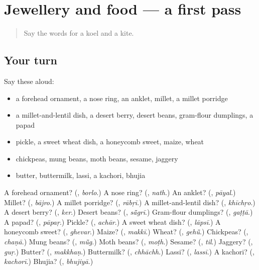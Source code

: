 \section[(dialogue)]{Jewellery and food — a first pass}

\label{lesson:MW-R139-first-pass-jewellery-and-food}



\begin{quote}
Say the words for a koel and a kite.
\end{quote}

\subsection*{Your turn}
Say these aloud:

\begin{itemize}
\raggedright
  \item a forehead ornament, a nose ring, an anklet, millet, a millet porridge
  \item a millet-and-lentil dish, a desert berry, desert beans, gram-flour dumplings, a papad
  \item pickle, a sweet wheat dish, a honeycomb sweet, maize, wheat
  \item chickpeas, mung beans, moth beans, sesame, jaggery
  \item butter, buttermilk, lassi, a kachori, bhujia
\end{itemize}

\begin{tcolorbox}[breakable,colback=teal!4,colframe=teal!35!black,title={Before you move on}]
A forehead ornament? (\textbf{}, \emph{borlo}.) A nose ring? (\textbf{}, \emph{nath}.) An anklet? (\textbf{}, \emph{pāyal}.) Millet? (\textbf{}, \emph{bājro}.) A millet porridge? (\textbf{}, \emph{rābṛī}.) A millet-and-lentil dish? (\textbf{}, \emph{khīchṛo}.) A desert berry? (\textbf{}, \emph{ker}.) Desert beans? (\textbf{}, \emph{sā̃grī}.) Gram-flour dumplings? (\textbf{}, \emph{gaṭṭā}.) A papad? (\textbf{}, \emph{pāpaṛ}.) Pickle? (\textbf{}, \emph{achār}.) A sweet wheat dish? (\textbf{}, \emph{lāpsī}.) A honeycomb sweet? (\textbf{}, \emph{ghevar}.) Maize? (\textbf{}, \emph{makkī}.) Wheat? (\textbf{}, \emph{gehū̃}.) Chickpeas? (\textbf{}, \emph{chaṇā}.) Mung beans? (\textbf{}, \emph{mū̃g}.) Moth beans? (\textbf{}, \emph{moṭh}.) Sesame? (\textbf{}, \emph{til}.) Jaggery? (\textbf{}, \emph{guṛ}.) Butter? (\textbf{}, \emph{makkhaṇ}.) Buttermilk? (\textbf{}, \emph{chhāchh}.) Lassi? (\textbf{}, \emph{lassī}.) A kachori? (\textbf{}, \emph{kachorī}.) Bhujia? (\textbf{}, \emph{bhujiyā}.)
\end{tcolorbox}

